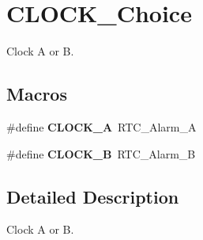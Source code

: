 \hypertarget{group___c_l_o_c_k___choice}{}\section{C\+L\+O\+C\+K\+\_\+\+Choice}
\label{group___c_l_o_c_k___choice}


Clock A or B.  


\subsection*{Macros}
\begin{DoxyCompactItemize}
\item 
\mbox{\label{group___c_l_o_c_k___choice_gaa6850d52f4718938783dcc4b932f78ac}} 
\#define {\bfseries C\+L\+O\+C\+K\+\_\+A}~R\+T\+C\+\_\+\+Alarm\+\_\+A
\item 
\mbox{\label{group___c_l_o_c_k___choice_gaa955d6afa2e3fcc5dc68064b9cd5161f}} 
\#define {\bfseries C\+L\+O\+C\+K\+\_\+B}~R\+T\+C\+\_\+\+Alarm\+\_\+B
\end{DoxyCompactItemize}


\subsection{Detailed Description}
Clock A or B. 

